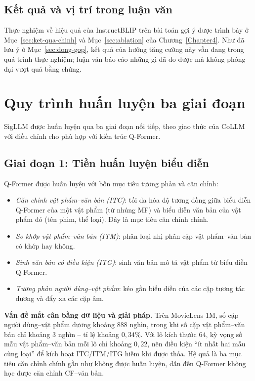 \subsection{Kết quả và vị trí trong luận văn}
\label{ssec:instructblip-ket-qua}

Thực nghiệm về hiệu quả của InstructBLIP trên bài toán gợi ý được trình bày ở
Mục~\ref{sec:ket-qua-chinh} và Mục~\ref{sec:ablation} của Chương~\ref{Chapter4}. Như
đã lưu ý ở Mục~\ref{sec:dong-gop}, kết quả của hướng tăng cường này vẫn đang trong quá
trình thực nghiệm; luận văn báo cáo những gì đã đo được mà không phóng đại vượt
quá bằng chứng.

\section{Quy trình huấn luyện ba giai đoạn}
\label{sec:ba-giai-doan}

SigLLM được huấn luyện qua ba giai đoạn nối tiếp, theo giao thức của CoLLM~\cite{collm2023}
với điều chỉnh cho phù hợp với kiến trúc Q-Former.

\subsection{Giai đoạn 1: Tiền huấn luyện biểu diễn}
\label{ssec:stage1}

Q-Former được huấn luyện với bốn mục tiêu tương phản và căn chỉnh:

\begin{itemize}
    \item \textit{Căn chỉnh vật phẩm--văn bản (ITC)}: tối đa hóa độ tương đồng giữa biểu
    diễn Q-Former của một vật phẩm (từ nhúng MF) và biểu diễn văn bản của vật phẩm đó
    (tên phim, thể loại). Đây là mục tiêu căn chỉnh chính.

    \item \textit{So khớp vật phẩm--văn bản (ITM)}: phân loại nhị phân cặp
    vật phẩm--văn bản có khớp hay không.

    \item \textit{Sinh văn bản có điều kiện (ITG)}: sinh văn bản mô tả vật phẩm từ biểu
    diễn Q-Former.

    \item \textit{Tương phản người dùng--vật phẩm}: kéo gần biểu diễn của các cặp tương
    tác dương và đẩy xa các cặp âm.
\end{itemize}

\textbf{Vấn đề mất cân bằng dữ liệu và giải pháp.} Trên MovieLens-1M, số cặp người
dùng--vật phẩm dương khoảng $888$ nghìn, trong khi số cặp vật phẩm--văn bản chỉ khoảng
$3$ nghìn -- tỉ lệ khoảng $0{,}34\%$. Với lô kích thước $64$, kỳ vọng số mẫu
vật phẩm--văn bản mỗi lô chỉ khoảng $0{,}22$, nên điều kiện ``ít nhất hai mẫu cùng loại''
để kích hoạt ITC/ITM/ITG hiếm khi được thỏa. Hệ quả là ba mục tiêu căn chỉnh chính gần
như không được huấn luyện, dẫn đến Q-Former không học được căn chỉnh CF--văn bản.

